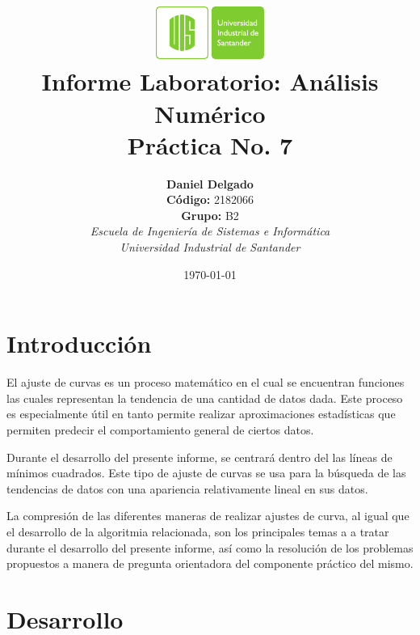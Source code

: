 \documentclass[english,notitlepage,letterpaper, 10pt]{article} %
\newcommand{\university}{\normalsize Universidad Industrial de Santander}
\newcommand{\faculty}{\normalsize  Escuela de Ingenier\'ia de Sistemas e Inform\'atica}
\newcommand{\codigo}{\normalsize  2182066}
\newcommand{\grupo}{\normalsize  B2}
\begin{document}
\title{	\vspace{-12mm}\includegraphics[width=0.2\linewidth]{Logos/UIS.pdf}\\Informe Laboratorio: An\'alisis Num\'erico\\  \centering Pr\'actica No. 7}
\author{
  \textbf{Daniel Delgado} \\ \textbf{C\'odigo:} \codigo\\
  \textbf{Grupo:} \grupo\\
  \textit{\faculty}\\
  \textit{\university}}
\date{\today}
\maketitle

\section{Introducci\'on}

El ajuste de curvas es un proceso matemático en el cual se encuentran funciones las cuales representan la tendencia de una cantidad de datos dada. Este proceso es especialmente útil en tanto permite realizar aproximaciones estadísticas que permiten predecir el comportamiento general de ciertos datos.

Durante el desarrollo del presente informe, se centrará dentro del las líneas de mínimos cuadrados. Este tipo de ajuste de curvas se usa para la búsqueda de las tendencias de datos con una apariencia relativamente lineal en sus datos.

La compresión de las diferentes maneras de realizar ajustes de curva, al igual que el desarrollo de la algoritmia relacionada, son los principales temas a a tratar durante el desarrollo del presente informe, así como la resolución de los problemas propuestos a manera de pregunta orientadora del componente práctico del mismo.

\section{Desarrollo}
\end{document}
